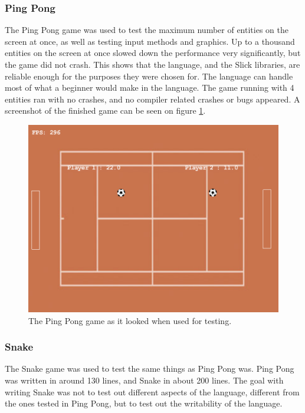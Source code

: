 \subsubsection{Ping Pong}
The Ping Pong game was used to test the maximum number of entities on the screen at once, as well as testing input methods and graphics. Up to a thousand entities on the screen at once slowed down the performance very significantly, but the game did not crash. This shows that the language, and the Slick libraries, are reliable enough for the purposes they were chosen for. The language can handle most of what a beginner would make in the language. The game running with 4 entities ran with no crashes, and no compiler related crashes or bugs appeared. A screenshot of the finished game can be seen on figure \ref{fig:pingpong}.
\begin{figure}[H]
    \centering
    \includegraphics[scale=0.4]{resources/Images/newscreenshot.png}
    \caption{The Ping Pong game as it looked when used for testing.}\label{fig:pingpong}
\end{figure}

\subsubsection{Snake}
The Snake game was used to test the same things as Ping Pong was. Ping Pong was written in around 130 lines, and Snake in about 200 lines. The goal with writing Snake was not to test out different aspects of the language, different from the ones tested in Ping Pong, but to test out the writability of the language.
\pagebreak